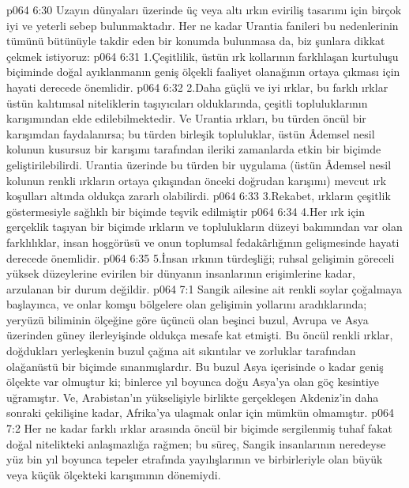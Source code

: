 \vs p064 6:30 Uzayın dünyaları üzerinde üç veya altı ırkın eviriliş tasarımı için birçok iyi ve yeterli sebep bulunmaktadır. Her ne kadar Urantia fanileri bu nedenlerinin tümünü bütünüyle takdir eden bir konumda bulunmasa da, biz şunlara dikkat çekmek istiyoruz:
\vs p064 6:31 1.\bibnobreakspace Çeşitlilik, üstün ırk kollarının farklılaşan kurtuluşu biçiminde doğal ayıklanmanın geniş ölçekli faaliyet olanağının ortaya çıkması için hayati derecede önemlidir.
\vs p064 6:32 2.\bibnobreakspace Daha güçlü ve iyi ırklar, bu farklı ırklar üstün kalıtımsal niteliklerin taşıyıcıları olduklarında, çeşitli topluluklarının karışımından elde edilebilmektedir. Ve Urantia ırkları, bu türden öncül bir karışımdan faydalanırsa; bu türden birleşik topluluklar, üstün Âdemsel nesil kolunun kusursuz bir karışımı tarafından ileriki zamanlarda etkin bir biçimde geliştirilebilirdi. Urantia üzerinde bu türden bir uygulama (üstün Âdemsel nesil kolunun renkli ırkların ortaya çıkışından önceki doğrudan karışımı) mevcut ırk koşulları altında oldukça zararlı olabilirdi.
\vs p064 6:33 3.\bibnobreakspace Rekabet, ırkların çeşitlik göstermesiyle sağlıklı bir biçimde teşvik edilmiştir
\vs p064 6:34 4.\bibnobreakspace Her ırk için gerçeklik taşıyan bir biçimde ırkların ve toplulukların düzeyi bakımından var olan farklılıklar, insan hoşgörüsü ve onun toplumsal fedakârlığının gelişmesinde hayati derecede önemlidir.
\vs p064 6:35 5.\bibnobreakspace İnsan ırkının türdeşliği; ruhsal gelişimin göreceli yüksek düzeylerine evirilen bir dünyanın insanlarının erişimlerine kadar, arzulanan bir durum değildir.
\vs p064 7:1 Sangik ailesine ait renkli soylar çoğalmaya başlayınca, ve onlar komşu bölgelere olan gelişimin yollarını aradıklarında; yeryüzü biliminin ölçeğine göre üçüncü olan beşinci buzul, Avrupa ve Asya üzerinden güney ilerleyişinde oldukça mesafe kat etmişti. Bu öncül renkli ırklar, doğdukları yerleşkenin buzul çağına ait sıkıntılar ve zorluklar tarafından olağanüstü bir biçimde sınanmışlardır. Bu buzul Asya içerisinde o kadar geniş ölçekte var olmuştur ki; binlerce yıl boyunca doğu Asya’ya olan göç kesintiye uğramıştır. Ve, Arabistan’ın yükselişiyle birlikte gerçekleşen Akdeniz’in daha sonraki çekilişine kadar, Afrika’ya ulaşmak onlar için mümkün olmamıştır.
\vs p064 7:2 Her ne kadar farklı ırklar arasında öncül bir biçimde sergilenmiş tuhaf fakat doğal nitelikteki anlaşmazlığa rağmen; bu süreç, Sangik insanlarının neredeyse yüz bin yıl boyunca tepeler etrafında yayılışlarının ve birbirleriyle olan büyük veya küçük ölçekteki karışımının dönemiydi.

